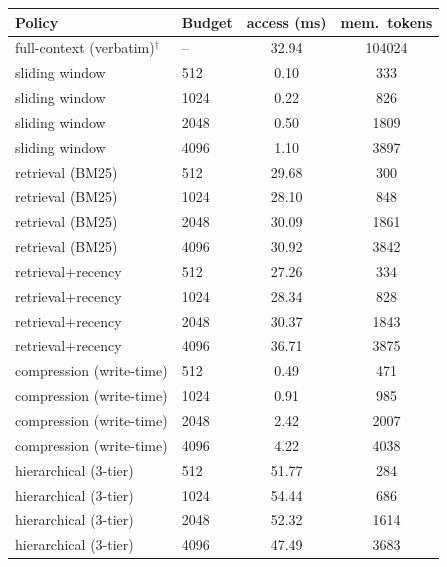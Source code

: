 \begin{tabular}{llcc}
\toprule
Policy & Budget & access (ms) & mem.\ tokens \\
\midrule
full-context (verbatim)$^{\dagger}$ & -- & 32.94 & 104024 \\
sliding window & 512 & 0.10 & 333 \\
sliding window & 1024 & 0.22 & 826 \\
sliding window & 2048 & 0.50 & 1809 \\
sliding window & 4096 & 1.10 & 3897 \\
retrieval (BM25) & 512 & 29.68 & 300 \\
retrieval (BM25) & 1024 & 28.10 & 848 \\
retrieval (BM25) & 2048 & 30.09 & 1861 \\
retrieval (BM25) & 4096 & 30.92 & 3842 \\
retrieval+recency & 512 & 27.26 & 334 \\
retrieval+recency & 1024 & 28.34 & 828 \\
retrieval+recency & 2048 & 30.37 & 1843 \\
retrieval+recency & 4096 & 36.71 & 3875 \\
compression (write-time) & 512 & 0.49 & 471 \\
compression (write-time) & 1024 & 0.91 & 985 \\
compression (write-time) & 2048 & 2.42 & 2007 \\
compression (write-time) & 4096 & 4.22 & 4038 \\
hierarchical (3-tier) & 512 & 51.77 & 284 \\
hierarchical (3-tier) & 1024 & 54.44 & 686 \\
hierarchical (3-tier) & 2048 & 52.32 & 1614 \\
hierarchical (3-tier) & 4096 & 47.49 & 3683 \\
\bottomrule
\end{tabular}